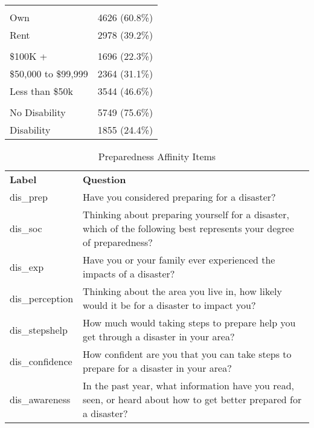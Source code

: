 \documentclass[
  letterpaper,
  DIV=11,
  numbers=noendperiod]{scrartcl}
\begin{document}
\begin{table}
{\begin{tabular}[t]{ll}
\addlinespace[0.3em]
\multicolumn{2}{l}{\textbf{Homeownership}}\\
\hspace{1em}Own & 4626 (60.8\%)\\
\hspace{1em}Rent & 2978 (39.2\%)\\
\addlinespace[0.3em]
\multicolumn{2}{l}{\textbf{Income}}\\
\hspace{1em}\$100K + & 1696 (22.3\%)\\
\hspace{1em}\$50,000 to \$99,999 & 2364 (31.1\%)\\
\hspace{1em}Less than \$50k & 3544 (46.6\%)\\
\addlinespace[0.3em]
\multicolumn{2}{l}{\textbf{Disability}}\\
\hspace{1em}No Disability & 5749 (75.6\%)\\
\hspace{1em}Disability & 1855 (24.4\%)\\
\bottomrule
\end{tabular}

}

\end{table}%

\begin{longtable}[]{@{}
  >{\raggedright\arraybackslash}p{}
  >{\raggedright\arraybackslash}p{}@{}}
\caption{Preparedness Affinity Items}\label{tbl-items}\tabularnewline
\toprule\noalign{}
\endfirsthead
\endhead
\bottomrule\noalign{}
\endlastfoot
\textbf{Label} & \textbf{Question} \\
dis\_prep & Have you considered preparing for a disaster? \\
dis\_soc & Thinking about preparing yourself for a disaster, which of
the following best represents your degree of preparedness? \\
dis\_exp & Have you or your family ever experienced the impacts of a
disaster? \\
dis\_perception & Thinking about the area you live in, how likely would
it be for a disaster to impact you? \\
dis\_stepshelp & How much would taking steps to prepare help you get
through a disaster in your area? \\
dis\_confidence & How confident are you that you can take steps to
prepare for a disaster in your area? \\
dis\_awareness & In the past year, what information have you read, seen,
or heard about how to get better prepared for a disaster? \\
\end{longtable}
\end{document}
